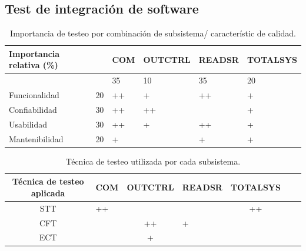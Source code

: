 \documentclass[11pt]{article}
\begin{document}
\newpage
\subsection{Test de integración de software}
\FloatBarrier
\begin{table}[!ht]
    \centering
    \begin{tabular}{|l|l|l|l|l|l|}\hline \hline
        \rowcolor[HTML]{d6c6c3}
        Importancia relativa (\%) &    & COM & OUTCTRL & READSR & TOTALSYS \\
        \hline

                                  &    & 35  & 10      & 35     & 20       \\
        Funcionalidad             & 20 & ++  & +       & ++     & +        \\
        Confiabilidad             & 30 & ++  & ++      &        & +        \\
        Usabilidad                & 30 & ++  & +       & ++     & +        \\
        Mantenibilidad            & 20 & +   &         & +      & +        \\
        \hline
    \end{tabular}
    \caption{Importancia de testeo por combinación de subsistema/ característic
        de calidad.}
\end{table}

\FloatBarrier
\begin{table}[!ht]
    \centering
    \begin{tabularx}{\linewidth}{@{}|c|X|c|X|c|X|c|@{}}\hline \hline
        \rowcolor[HTML]{d6c6c3}
        Técnica de testeo aplicada & COM & OUTCTRL & READSR & TOTALSYS \\
        \hline
        STT                        & ++  &         &        & ++       \\
        CFT                        &     & ++      & +      &          \\
        ECT                        &     & +       &        &          \\
        \hline
    \end{tabularx}
    \caption{Técnica de testeo utilizada por cada subsistema.}
\end{table}
\end{document}
